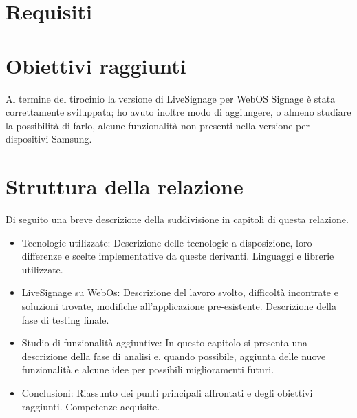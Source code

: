 \section{Requisiti}

\section{Obiettivi raggiunti}

Al termine del tirocinio la versione di LiveSignage per WebOS Signage è stata correttamente sviluppata; ho avuto inoltre modo di aggiungere, o almeno studiare la possibilità di farlo, alcune funzionalità non presenti nella versione per dispositivi Samsung. 

\section{Struttura della relazione}
Di seguito una breve descrizione della suddivisione in capitoli di questa relazione.
\begin{itemize}
    \item Tecnologie utilizzate: Descrizione delle tecnologie a disposizione, loro differenze e scelte implementative da queste derivanti. Linguaggi e librerie utilizzate.
    \item LiveSignage su WebOs: Descrizione del lavoro svolto, difficoltà incontrate e soluzioni trovate, modifiche all'applicazione pre-esistente. Descrizione della fase di testing finale.
    \item Studio di funzionalità aggiuntive: In questo capitolo si presenta una descrizione della fase di analisi e, quando possibile, aggiunta delle nuove funzionalità e alcune idee per possibili miglioramenti futuri.
    \item Conclusioni: Riassunto dei punti principali affrontati e degli obiettivi raggiunti. Competenze acquisite.
\end{itemize}